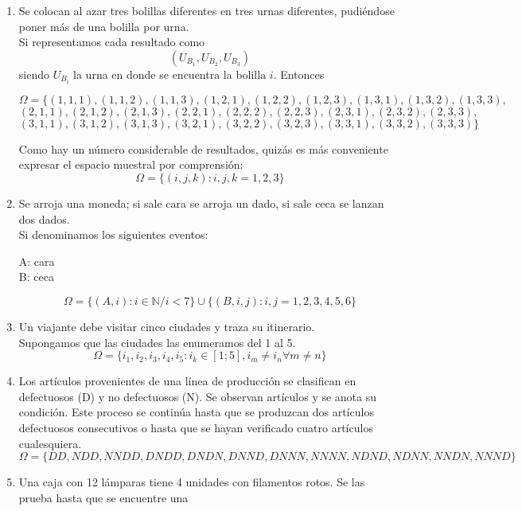 \begin{enumerate}
        \item Se colocan al azar tres bolillas diferentes en tres urnas diferentes, pudiéndose poner más de una bolilla por urna.\vspace{3mm}\\
            Si representamos cada resultado como \[(U_{B_1},U_{B_2},U_{B_3})\]
            siendo $U_{B_i}$ la urna en donde se encuentra la bolilla $i$. Entonces
            \begin{center}
                $\Omega=\{(1,1,1),(1,1,2),(1,1,3),(1,2,1),(1,2,2),(1,2,3),(1,3,1),(1,3,2),(1,3,3),$\\
                $(2,1,1),(2,1,2),(2,1,3),(2,2,1),(2,2,2),(2,2,3),(2,3,1),(2,3,2),(2,3,3),$\\
                $(3,1,1),(3,1,2),(3,1,3),(3,2,1),(3,2,2),(3,2,3),(3,3,1),(3,3,2),(3,3,3)\}$
            \end{center}
            Como hay un número considerable de resultados, quizás es más conveniente expresar el espacio muestral por comprensión:
            \[\Omega=\{(i,j,k):i,j,k=1,2,3\}\]
        \item Se arroja una moneda; si sale cara se arroja un dado, si sale ceca se lanzan dos dados.\vspace{3mm}\\
            Si denominamos los siguientes eventos:
            \begin{center}
                A: cara\\
                B: ceca
            \end{center}
            \[\Omega=\{(A,i):i\in\mathbb{N}/i<7\}\cup\{(B,i,j):i,j=1,2,3,4,5,6\}\]
        \item Un viajante debe visitar cinco ciudades y traza su itinerario.\vspace{3mm}\\
            Supongamos que las ciudades las enumeramos del 1 al 5.\[\Omega=\{i_1,i_2,i_3,i_4,i_5:i_k\in[1;5],i_m\neq i_n\forall m\neq n\}\]
        \item Los artículos provenientes de una línea de producción se clasifican en defectuosos (D) y no defectuosos (N). Se observan artículos y se anota su condición. Este proceso se continúa hasta que se produzcan dos artículos defectuosos consecutivos o hasta que se hayan verificado cuatro artículos cualesquiera.
            \[\Omega=\{DD,NDD,NNDD,DNDD,DNDN,DNND,DNNN,NNNN,NDND,NDNN,NNDN,NNND\}\]
        \item Una caja con 12 lámparas tiene 4 unidades con filamentos rotos. Se las prueba hasta que se encuentre una

\end{enumerate}
